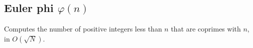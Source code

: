 \subsection{Euler phi $\varphi(n)$}

Computes the number of positive integers less than $n$ that are coprimes with $n$, in $O(\sqrt{N})$.
